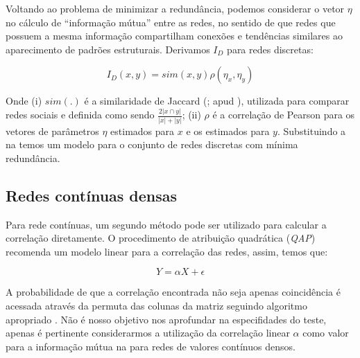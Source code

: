 Voltando ao problema de minimizar a redundância, podemos considerar o vetor
$\eta$ no cálculo de ``informação mútua'' entre as redes, no sentido de que redes
que possuem a mesma informação compartilham conexões e tendências similares ao
aparecimento de padrões estruturais. Derivamos $I_D$ para redes discretas:

\begin{equation}
\label{def:MI_discreto}
I_D(x, y) = sim(x,y) \rho(\eta_x, \eta_y)
\end{equation}

Onde (i) $sim(.)$ é a similaridade de Jaccard (\citealt{Jaccard1912}; apud
\citealt{Berger-Wolf2006}), utilizada para comparar redes sociais e definida como
sendo $\frac{2|x\cap y|}{|x| + |y|}$; (ii) $\rho$ é a correlação de Pearson para
os vetores de parâmetros $\eta$ estimados para $x$ e os estimados para $y$.
Substituindo a  na  temos um
modelo para o conjunto de redes discretas com mínima redundância.

\subsection{Redes contínuas densas}

Para rede contínuas, um segundo método pode ser utilizado para calcular a
correlação diretamente. O procedimento de atribuição quadrática (\textit{QAP})
recomenda um modelo linear para a correlação das redes, assim, temos que:

\begin{equation}
\label{def:linear_model_qap}
Y = \alpha X + \epsilon
\end{equation}

A probabilidade de que a correlação encontrada não seja apenas coincidência é
acessada através da permuta das colunas da matriz seguindo algoritmo apropriado
\citep{Anderson2001, Dekker2007}. Não é nosso objetivo nos aprofundar na
especifidades do teste, apenas é pertinente considerarmos a  utilização da
correlação linear $\alpha$ como valor para a informação mútua na
 para redes de valores contínuos densos.
